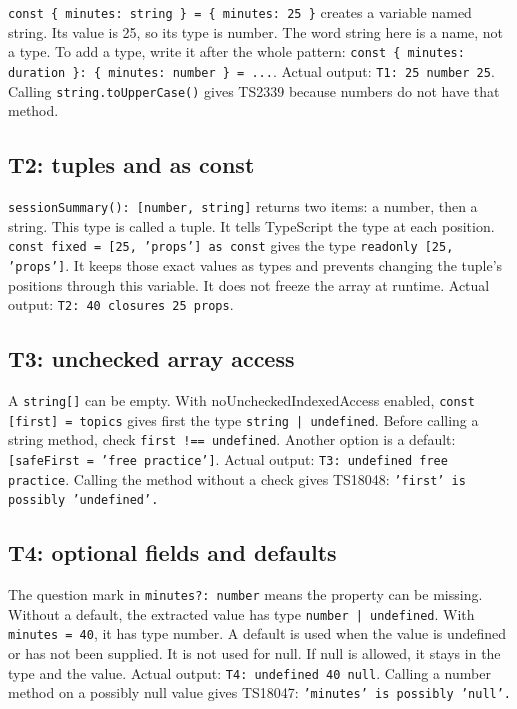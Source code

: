 \documentclass[
  10pt,
  a4paper,
]{article}
\begin{document}
\texttt{const \{ minutes:\allowbreak{} string \} = \{ minutes:\allowbreak{} 25 \}}
creates a variable named string. Its value is 25, so its type is number.
The word string here is a name, not a type. To add a type, write it
after the whole pattern:
\texttt{const \{ minutes:\allowbreak{} duration \}:\allowbreak{} \{ minutes:\allowbreak{} number \} = .\allowbreak{}.\allowbreak{}.\allowbreak{}}.
Actual output: \texttt{T1:\allowbreak{} 25 number 25}. Calling
\texttt{string.\allowbreak{}toUpperCase()} gives TS2339 because numbers
do not have that method.

\subsection{T2: tuples and as const}\label{t2-tuples-and-as-const}

\texttt{sessionSummary():\allowbreak{} [number, string]} returns two
items: a number, then a string. This type is called a tuple. It tells
TypeScript the type at each position.
\texttt{const fixed = [25, 'props'] as const} gives the type
\texttt{readonly [25, 'props']}. It keeps those exact values as types
and prevents changing the tuple's positions through this variable. It
does not freeze the array at runtime. Actual output:
\texttt{T2:\allowbreak{} 40 closures 25 props}.

\subsection{T3: unchecked array access}\label{t3-unchecked-array-access}

A \texttt{string[]} can be empty. With noUncheckedIndexedAccess enabled,
\texttt{const [first] = topics} gives first the type
\texttt{string | undefined}. Before calling a string method, check
\texttt{first !== undefined}. Another option is a default:
\texttt{[safeFirst = 'free practice']}. Actual output:
\texttt{T3:\allowbreak{} undefined free practice}. Calling the method
without a check gives TS18048:
\texttt{'first' is possibly 'undefined'.\allowbreak{}}

\subsection{T4: optional fields and
defaults}\label{t4-optional-fields-and-defaults}

The question mark in \texttt{minutes?:\allowbreak{} number} means the
property can be missing. Without a default, the extracted value has type
\texttt{number | undefined}. With \texttt{minutes = 40}, it has type
number. A default is used when the value is undefined or has not been
supplied. It is not used for null. If null is allowed, it stays in the
type and the value. Actual output:
\texttt{T4:\allowbreak{} undefined 40 null}. Calling a number method on
a possibly null value gives TS18047:
\texttt{'minutes' is possibly 'null'.\allowbreak{}}
\end{document}
